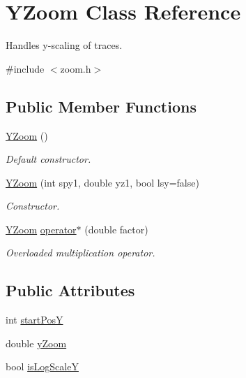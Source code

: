\hypertarget{classYZoom}{
\section{YZoom Class Reference}
\label{classYZoom}
}


Handles y-\/scaling of traces.  




{\ttfamily \#include $<$zoom.h$>$}

\subsection*{Public Member Functions}
\begin{DoxyCompactItemize}
\item 
\hypertarget{classYZoom_aef0ee9dd37904976f52992b58cb90e3f}{
\hyperlink{classYZoom_aef0ee9dd37904976f52992b58cb90e3f}{YZoom} ()}
\label{classYZoom_aef0ee9dd37904976f52992b58cb90e3f}

\begin{DoxyCompactList}\small\item\em Default constructor. \item\end{DoxyCompactList}\item 
\hyperlink{classYZoom_abe91a1f8e7449c7292e53b9a16547cd6}{YZoom} (int spy1, double yz1, bool lsy=false)
\begin{DoxyCompactList}\small\item\em Constructor. \item\end{DoxyCompactList}\item 
\hypertarget{classYZoom_a27395fa95cfcb97f2aafef6992e33d72}{
\hyperlink{classYZoom}{YZoom} \hyperlink{classYZoom_a27395fa95cfcb97f2aafef6992e33d72}{operator$\ast$} (double factor)}
\label{classYZoom_a27395fa95cfcb97f2aafef6992e33d72}

\begin{DoxyCompactList}\small\item\em Overloaded multiplication operator. \item\end{DoxyCompactList}\end{DoxyCompactItemize}
\subsection*{Public Attributes}
\begin{DoxyCompactItemize}
\item 
int \hyperlink{classYZoom_af355677b65fef84eb770465ecc0a798d}{startPosY}
\item 
double \hyperlink{classYZoom_aa271e5b2fe2e341750e8382a520ee5ec}{yZoom}
\item 
bool \hyperlink{classYZoom_a567f0d098e5946bce74b0bcc97bc328d}{isLogScaleY}
\end{DoxyCompactItemize}


